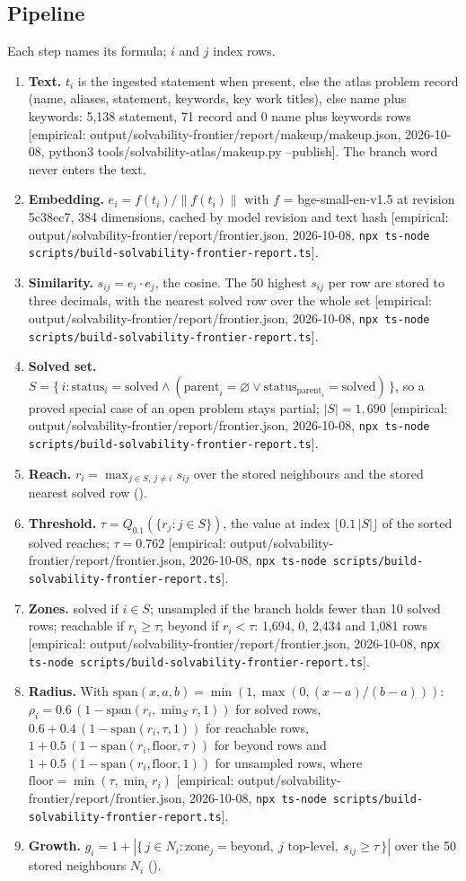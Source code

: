\documentclass[11pt]{article}
\newcommand{\emp}[1]{\textcolor{bucketgray}{\footnotesize [empirical: #1]}}
\newcommand{\cmd}{\texttt{npx ts-node scripts/build-solvability-frontier-report.ts}}
\newcommand{\fr}{\emp{output/solvability-frontier/report/frontier.json, 2026-10-08, \cmd}}
\newcommand{\mk}{\emp{output/solvability-frontier/report/makeup/makeup.json, 2026-10-08, python3 tools/solvability-atlas/makeup.py --publish}}
\begin{document}
\subsection{Pipeline}

Each step names its formula; $i$ and $j$ index rows.

\begin{enumerate}
  \item \textbf{Text.} $t_i$ is the ingested statement when present, else the atlas problem record (name, aliases, statement, keywords, key work titles), else name plus keywords: 5,138 statement, 71 record and 0 name plus keywords rows \mk. The branch word never enters the text.
  \item \textbf{Embedding.} $e_i = f(t_i)/\lVert f(t_i)\rVert$ with $f$ = bge-small-en-v1.5 at revision 5c38ec7, 384 dimensions, cached by model revision and text hash \fr.
  \item \textbf{Similarity.} $s_{ij} = e_i \cdot e_j$, the cosine. The 50 highest $s_{ij}$ per row are stored to three decimals, with the nearest solved row over the whole set \fr.
  \item \textbf{Solved set.} $S = \{\, i : \mathrm{status}_i = \text{solved} \wedge (\mathrm{parent}_i = \varnothing \vee \mathrm{status}_{\mathrm{parent}_i} = \text{solved}) \,\}$, so a proved special case of an open problem stays partial; $|S| = 1{,}690$ \fr.
  \item \textbf{Reach.} $r_i = \max_{j \in S,\, j \neq i} s_{ij}$ over the stored neighbours and the stored nearest solved row ().
  \item \textbf{Threshold.} $\tau = Q_{0.1}(\{ r_j : j \in S \})$, the value at index $\lfloor 0.1\,|S| \rfloor$ of the sorted solved reaches; $\tau = 0.762$ \fr.
  \item \textbf{Zones.} solved if $i \in S$; unsampled if the branch holds fewer than 10 solved rows; reachable if $r_i \geq \tau$; beyond if $r_i < \tau$: 1,694, 0, 2,434 and 1,081 rows \fr.
  \item \textbf{Radius.} With $\mathrm{span}(x,a,b) = \min(1,\max(0,(x-a)/(b-a)))$: $\rho_i = 0.6\,(1 - \mathrm{span}(r_i, \min_S r, 1))$ for solved rows, $0.6 + 0.4\,(1 - \mathrm{span}(r_i, \tau, 1))$ for reachable rows, $1 + 0.5\,(1 - \mathrm{span}(r_i, \mathrm{floor}, \tau))$ for beyond rows and $1 + 0.5\,(1 - \mathrm{span}(r_i, \mathrm{floor}, 1))$ for unsampled rows, where $\mathrm{floor} = \min(\tau, \min_i r_i)$ \fr.
  \item \textbf{Growth.} $g_i = 1 + |\{\, j \in N_i : \mathrm{zone}_j = \text{beyond},\ j \text{ top-level},\ s_{ij} \geq \tau \,\}|$ over the 50 stored neighbours $N_i$ ().

\end{enumerate}
\end{document}
